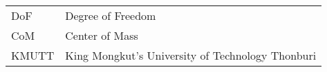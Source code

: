 \begin{abbreviations}
    \noindent
    \begin{tabular*}{\textwidth}{@{}p{}p{}@{}}
        {DoF} & {Degree of Freedom} \\
        {CoM} & {Center of Mass} \\
        {KMUTT} & {King Mongkut's University of Technology Thonburi} \\
    \end{tabular*}
\end{abbreviations}
